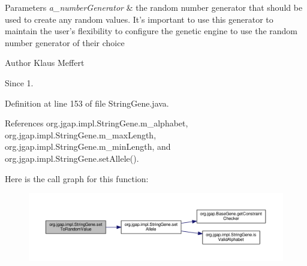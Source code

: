 \begin{DoxyParams}{Parameters}
{\em a\-\_\-number\-Generator} & the random number generator that should be used to create any random values. It's important to use this generator to maintain the user's flexibility to configure the genetic engine to use the random number generator of their choice\\
\hline
\end{DoxyParams}
\begin{DoxyAuthor}{Author}
Klaus Meffert 
\end{DoxyAuthor}
\begin{DoxySince}{Since}
1. 
\end{DoxySince}


Definition at line 153 of file String\-Gene.\-java.



References org.\-jgap.\-impl.\-String\-Gene.\-m\-\_\-alphabet, org.\-jgap.\-impl.\-String\-Gene.\-m\-\_\-max\-Length, org.\-jgap.\-impl.\-String\-Gene.\-m\-\_\-min\-Length, and org.\-jgap.\-impl.\-String\-Gene.\-set\-Allele().



Here is the call graph for this function\-:
\nopagebreak
\begin{figure}[H]
\begin{center}
\leavevmode
\includegraphics[width=350pt]{classorg_1_1jgap_1_1impl_1_1_string_gene_a8f5e8e9b1e5051e6b497ba6996ec6214_cgraph}
\end{center}
\end{figure}



